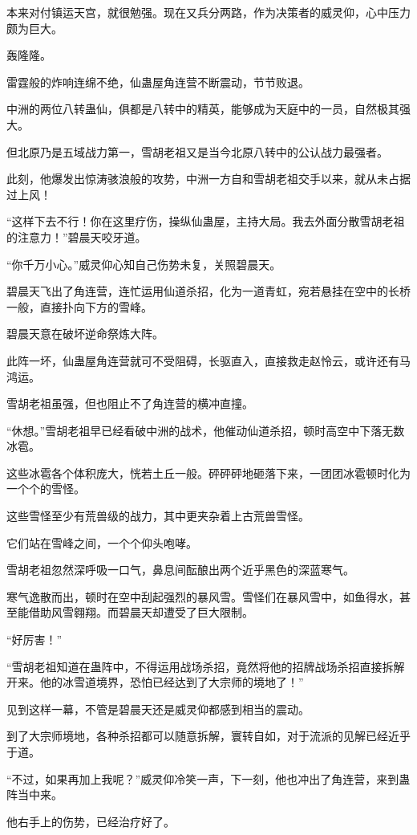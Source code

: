 \begin{this_body}
本来对付镇运天宫，就很勉强。现在又兵分两路，作为决策者的威灵仰，心中压力颇为巨大。

轰隆隆。

雷霆般的炸响连绵不绝，仙蛊屋角连营不断震动，节节败退。

中洲的两位八转蛊仙，俱都是八转中的精英，能够成为天庭中的一员，自然极其强大。

但北原乃是五域战力第一，雪胡老祖又是当今北原八转中的公认战力最强者。

此刻，他爆发出惊涛骇浪般的攻势，中洲一方自和雪胡老祖交手以来，就从未占据过上风！

“这样下去不行！你在这里疗伤，操纵仙蛊屋，主持大局。我去外面分散雪胡老祖的注意力！”碧晨天咬牙道。

“你千万小心。”威灵仰心知自己伤势未复，关照碧晨天。

碧晨天飞出了角连营，连忙运用仙道杀招，化为一道青虹，宛若悬挂在空中的长桥一般，直接扑向下方的雪峰。

碧晨天意在破坏逆命祭炼大阵。

此阵一坏，仙蛊屋角连营就可不受阻碍，长驱直入，直接救走赵怜云，或许还有马鸿运。

雪胡老祖虽强，但也阻止不了角连营的横冲直撞。

“休想。”雪胡老祖早已经看破中洲的战术，他催动仙道杀招，顿时高空中下落无数冰雹。

这些冰雹各个体积庞大，恍若土丘一般。砰砰砰地砸落下来，一团团冰雹顿时化为一个个的雪怪。

这些雪怪至少有荒兽级的战力，其中更夹杂着上古荒兽雪怪。

它们站在雪峰之间，一个个仰头咆哮。

雪胡老祖忽然深呼吸一口气，鼻息间酝酿出两个近乎黑色的深蓝寒气。

寒气逸散而出，顿时在空中刮起强烈的暴风雪。雪怪们在暴风雪中，如鱼得水，甚至能借助风雪翱翔。而碧晨天却遭受了巨大限制。

“好厉害！”

“雪胡老祖知道在蛊阵中，不得运用战场杀招，竟然将他的招牌战场杀招直接拆解开来。他的冰雪道境界，恐怕已经达到了大宗师的境地了！”

见到这样一幕，不管是碧晨天还是威灵仰都感到相当的震动。

到了大宗师境地，各种杀招都可以随意拆解，寰转自如，对于流派的见解已经近乎于道。

“不过，如果再加上我呢？”威灵仰冷笑一声，下一刻，他也冲出了角连营，来到蛊阵当中来。

他右手上的伤势，已经治疗好了。


\end{this_body}
